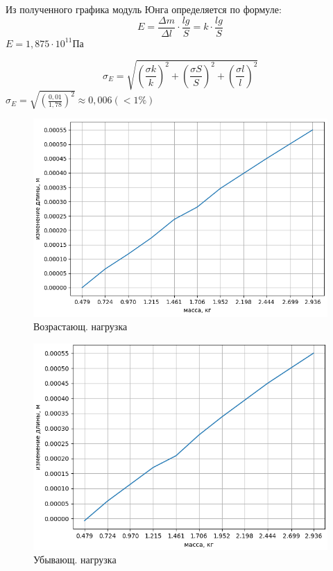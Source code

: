 \documentclass{article}
\begin{document}
\noindent
Из полученного графика модуль Юнга определяется по формуле:$$E=\frac{\Delta m}{\Delta l}\cdot\frac{lg}{S} = k\cdot\frac{lg}{S}$$ $E = 1,875\cdot10^{11}$Па

$$\sigma_E = \sqrt{(\frac{\sigma k}{k})^2 + (\frac{\sigma S}{S})^2 + (\frac{\sigma l}{l})^2}$$   
$\sigma_E = \sqrt{(\frac{0,01}{1,78})^2} \approx 0,006 (<1\%)$


\begin{figure}
    \centering
    \includegraphics[width=1\linewidth]{проволока возр.png}
    \caption{Возрастающ. нагрузка}
\end{figure}
\begin{figure}
    \centering
    \includegraphics[width=1\linewidth]{проволока убыв.png}
    \caption{Убывающ. нагрузка}
\end{figure}
\end{document}
